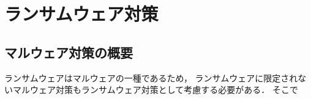 \chapter{ランサムウェア対策}
\section{マルウェア対策の概要}
ランサムウェアはマルウェアの一種であるため，
ランサムウェアに限定されないマルウェア対策もランサムウェア対策として考慮する必要がある．
そこで
